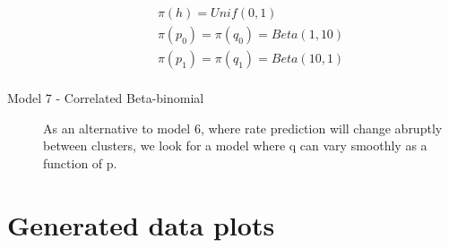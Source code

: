 \documentclass[11pt,a4,singlespacing,titlepagenumber=on]{scrreprt}
\numberwithin{equation}{chapter} %
\theoremstyle{remark}
\begin{document}
\begin{description}
 \begin{align}
	\pi(h) = Unif(0,1) \\
	\pi(p_0) = \pi(q_0) = Beta(1,10) \\
	\pi(p_1) = \pi(q_1) = Beta(10,1) \\
\end{align}

%
%
%
%

	\item[Model 7 - Correlated Beta-binomial]

As an alternative to model 6, where rate prediction will change abruptly between clusters, we look for a model where q can vary smoothly as a function of p.

\end{description}


\section{Generated data plots}
\end{document}
